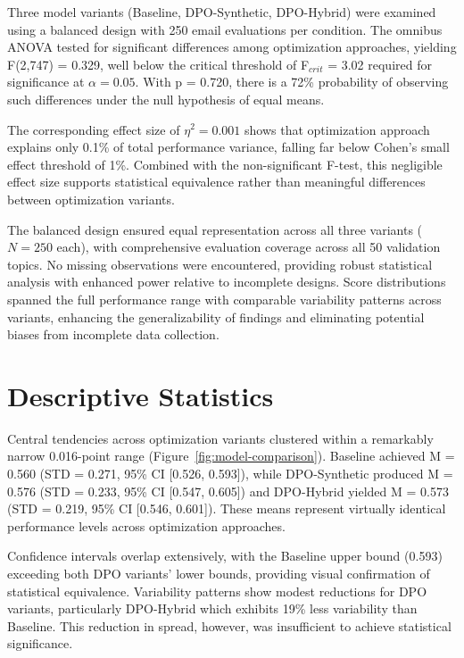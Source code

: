 Three model variants (Baseline, DPO-Synthetic, DPO-Hybrid) were examined using a balanced design with 250 email evaluations per condition. The omnibus ANOVA tested for significant differences among optimization approaches, yielding F(2,747) = 0.329, well below the critical threshold of F$_{crit}$ = 3.02 required for significance at $\alpha = 0.05$. With p = 0.720, there is a 72\% probability of observing such differences under the null hypothesis of equal means.

The corresponding effect size of $\eta^2 = 0.001$ shows that optimization approach explains only 0.1\% of total performance variance, falling far below Cohen's small effect threshold of 1\%. Combined with the non-significant F-test, this negligible effect size supports statistical equivalence rather than meaningful differences between optimization variants.

The balanced design ensured equal representation across all three variants ($N = 250$ each), with comprehensive evaluation coverage across all 50 validation topics. No missing observations were encountered, providing robust statistical analysis with enhanced power relative to incomplete designs. Score distributions spanned the full performance range with comparable variability patterns across variants, enhancing the generalizability of findings and eliminating potential biases from incomplete data collection.

\section{Descriptive Statistics}
\label{sec:descriptive-statistics}

Central tendencies across optimization variants clustered within a remarkably narrow 0.016-point range (Figure~\ref{fig:model-comparison}). Baseline achieved M = 0.560 (STD = 0.271, 95\% CI [0.526, 0.593]), while DPO-Synthetic produced M = 0.576 (STD = 0.233, 95\% CI [0.547, 0.605]) and DPO-Hybrid yielded M = 0.573 (STD = 0.219, 95\% CI [0.546, 0.601]). These means represent virtually identical performance levels across optimization approaches.

Confidence intervals overlap extensively, with the Baseline upper bound (0.593) exceeding both DPO variants' lower bounds, providing visual confirmation of statistical equivalence. Variability patterns show modest reductions for DPO variants, particularly DPO-Hybrid which exhibits 19\% less variability than Baseline. This reduction in spread, however, was insufficient to achieve statistical significance.

